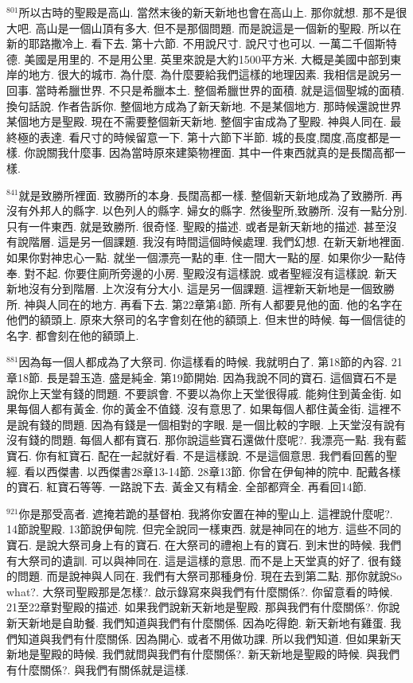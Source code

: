 \documentclass{book}
\begin{document}
$^{801}$所以古時的聖殿是高山.
當然末後的新天新地也會在高山上.
那你就想.
那不是很大吧.
高山是一個山頂有多大.
但不是那個問題.
而是說這是一個新的聖殿.
所以在新的耶路撒冷上.
看下去.
第十六節.
不用說尺寸.
說尺寸也可以.
一萬二千個斯特德.
美國是用里的.
不是用公里.
英里來說是大約1500平方米.
大概是美國中部到東岸的地方.
很大的城市.
為什麼.
為什麼要給我們這樣的地理因素.
我相信是說另一回事.
當時希臘世界.
不只是希臘本土.
整個希臘世界的面積.
就是這個聖城的面積.
換句話說.
作者告訴你.
整個地方成為了新天新地.
不是某個地方.
那時候還說世界某個地方是聖殿.
現在不需要整個新天新地.
整個宇宙成為了聖殿.
神與人同在.
最終極的表達.
看尺寸的時候留意一下.
第十六節下半節.
城的長度,闊度,高度都是一樣.
你說關我什麼事.
因為當時原來建築物裡面.
其中一件東西就真的是長闊高都一樣.

$^{841}$就是致勝所裡面.
致勝所的本身.
長闊高都一樣.
整個新天新地成為了致勝所.
再沒有外邦人的縣字.
以色列人的縣字.
婦女的縣字.
然後聖所,致勝所.
沒有一點分別.
只有一件東西.
就是致勝所.
很奇怪.
聖殿的描述.
或者是新天新地的描述.
甚至沒有說階層.
這是另一個課題.
我沒有時間這個時候處理.
我們幻想.
在新天新地裡面.
如果你對神忠心一點.
就坐一個漂亮一點的車.
住一間大一點的屋.
如果你少一點侍奉.
對不起.
你要住廁所旁邊的小房.
聖殿沒有這樣說.
或者聖經沒有這樣說.
新天新地沒有分到階層.
上次沒有分大小.
這是另一個課題.
這裡新天新地是一個致勝所.
神與人同在的地方.
再看下去.
第22章第4節.
所有人都要見他的面.
他的名字在他們的額頭上.
原來大祭司的名字會刻在他的額頭上.
但末世的時候.
每一個信徒的名字.
都會刻在他的額頭上.

$^{881}$因為每一個人都成為了大祭司.
你這樣看的時候.
我就明白了.
第18節的內容.
21章18節.
長是碧玉造.
盛是純金.
第19節開始.
因為我說不同的寶石.
這個寶石不是說你上天堂有錢的問題.
不要誤會.
不要以為你上天堂很得戚.
能夠住到黃金街.
如果每個人都有黃金.
你的黃金不值錢.
沒有意思了.
如果每個人都住黃金街.
這裡不是說有錢的問題.
因為有錢是一個相對的字眼.
是一個比較的字眼.
上天堂沒有說有沒有錢的問題.
每個人都有寶石.
那你說這些寶石還做什麼呢?.
我漂亮一點.
我有藍寶石.
你有紅寶石.
配在一起就好看.
不是這樣說.
不是這個意思.
我們看回舊的聖經.
看以西傑書.
以西傑書28章13-14節.
28章13節.
你曾在伊甸神的院中.
配戴各樣的寶石.
紅寶石等等.
一路說下去.
黃金又有精金.
全部都齊全.
再看回14節.

$^{921}$你是那受高者.
遮掩若跪的基督柏.
我將你安置在神的聖山上.
這裡說什麼呢?.
14節說聖殿.
13節說伊甸院.
但完全說同一樣東西.
就是神同在的地方.
這些不同的寶石.
是說大祭司身上有的寶石.
在大祭司的禮袍上有的寶石.
到末世的時候.
我們有大祭司的遺訓.
可以與神同在.
這是這樣的意思.
而不是上天堂真的好了.
很有錢的問題.
而是說神與人同在.
我們有大祭司那種身份.
現在去到第二點.
那你就說So what?.
大祭司聖殿那是怎樣?.
啟示錄寫來與我們有什麼關係?.
你留意看的時候.
21至22章對聖殿的描述.
如果我們說新天新地是聖殿.
那與我們有什麼關係?.
你說新天新地是自助餐.
我們知道與我們有什麼關係.
因為吃得飽.
新天新地有雞蛋.
我們知道與我們有什麼關係.
因為開心.
或者不用做功課.
所以我們知道.
但如果新天新地是聖殿的時候.
我們就問與我們有什麼關係?.
新天新地是聖殿的時候.
與我們有什麼關係?.
與我們有關係就是這樣.
\end{document}

